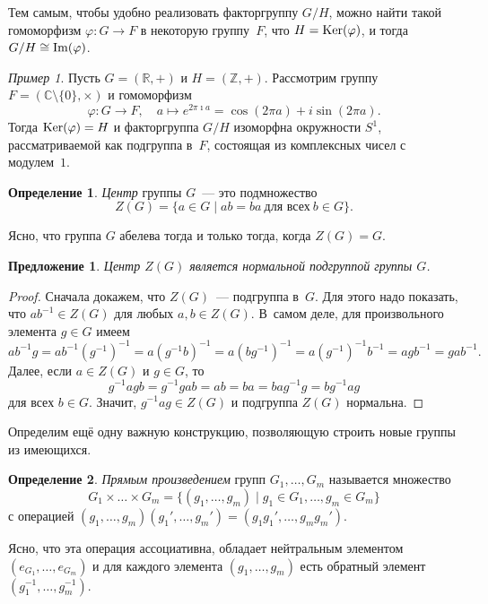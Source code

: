 \documentclass[a4paper,10pt]{amsart}
\def\Ker{{\rm Ker}}%
\def\Im{{\rm Im}}%
\def\CC{{\mathbb C}}%
\def\ZZ{{\mathbb Z}}%
\def\RR{{\mathbb R}}%
\newtheorem{proposition}{Предложение}
\theoremstyle{definition}
\newtheorem{definition}{Определение}
\theoremstyle{remark}
\newtheorem{example}{Пример}
\begin{document}
Тем самым, чтобы удобно реализовать факторгруппу $G/H$, можно найти
такой гомоморфизм $\varphi\colon G\to F$ в некоторую группу~$F$, что
$H = \Ker(\varphi)$, и тогда $G/H \cong \Im(\varphi)$.

\begin{example}
Пусть $G=(\RR,+)$ и $H=(\ZZ,+)$. Рассмотрим группу
$F=(\CC\setminus\{0\},\times)$ и гомоморфизм
$$
\varphi\colon G\to F, \quad a\mapsto e^{2\pi\imath a} = \cos (2\pi
a) + i \sin (2\pi a).
$$
Тогда $\Ker(\varphi)=H$ и факторгруппа $G/H$ изоморфна окружности
$S^1$, рассматриваемой как подгруппа в~$F$, состоящая из комплексных
чисел с модулем~$1$.
\end{example}

\begin{definition}
{\it Центр} группы $G$~--- это подмножество
$$
Z(G)=\{a\in G \mid ab=ba \ \text{для всех} \ b\in G\}.
$$
\end{definition}

Ясно, что группа $G$ абелева тогда и только тогда, когда $Z(G)=G$.

\begin{proposition}
Центр $Z(G)$ является нормальной подгруппой группы $G$.
\end{proposition}

\begin{proof}
Сначала докажем, что $Z(G)$~--- подгруппа в~$G$. Для этого надо
показать, что $ab^{-1}\in Z(G)$ для любых $a, b \in Z(G)$. В~самом
деле, для произвольного элемента $g \in G$ имеем
$$
ab^{-1}g = ab^{-1}(g^{-1})^{-1} = a (g^{-1}b)^{-1} = a(bg^{-1})^{-1}
= a (g^{-1})^{-1}b^{-1} = agb^{-1} = gab^{-1}.
$$
Далее, если $a \in Z(G)$ и $g\in G$, то
$$
g^{-1}agb=g^{-1}gab=ab=ba=bag^{-1}g=bg^{-1}ag
$$
для всех $b\in G$. Значит, $g^{-1}ag\in Z(G)$ и подгруппа $Z(G)$
нормальна.
\end{proof}

Определим ещё одну важную конструкцию, позволяющую строить новые
группы из имеющихся.

\begin{definition}
{\it Прямым произведением} групп $G_1, \ldots, G_m$ называется
множество
$$
G_1\times\ldots\times G_m=\{(g_1,\ldots,g_m) \mid g_1\in G_1,\ldots,
g_m\in G_m\}
$$
с операцией
$(g_1,\ldots,g_m)(g_1',\ldots,g_m')=(g_1g_1',\ldots,g_mg_m')$.
\end{definition}

Ясно, что эта операция ассоциативна, обладает нейтральным элементом
$(e_{G_1},\ldots,e_{G_m})$ и для каждого элемента $(g_1,\ldots,g_m)$
есть обратный элемент $(g_1^{-1},\ldots,g_m^{-1})$.
\end{document}
